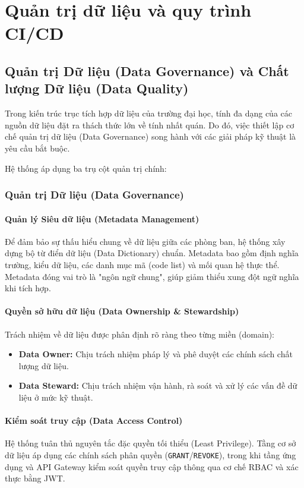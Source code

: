 \chapter{Quản trị dữ liệu và quy trình CI/CD}
\label{ch:data_gov}

\section{Quản trị Dữ liệu (Data Governance) và Chất lượng Dữ liệu (Data Quality)}

Trong kiến trúc trục tích hợp dữ liệu của trường đại học, tính đa dạng của các nguồn dữ liệu đặt ra thách thức lớn về tính nhất quán. Do đó, việc thiết lập cơ chế quản trị dữ liệu (Data Governance) song hành với các giải pháp kỹ thuật là yêu cầu bắt buộc.

Hệ thống áp dụng ba trụ cột quản trị chính:

\subsection{Quản trị Dữ liệu (Data Governance)}

\subsubsection{Quản lý Siêu dữ liệu (Metadata Management)}
Để đảm bảo sự thấu hiểu chung về dữ liệu giữa các phòng ban, hệ thống xây dựng bộ từ điển dữ liệu (Data Dictionary) chuẩn. Metadata bao gồm định nghĩa trường, kiểu dữ liệu, các danh mục mã (code list) và mối quan hệ thực thể. Metadata đóng vai trò là "ngôn ngữ chung", giúp giảm thiểu xung đột ngữ nghĩa khi tích hợp.

\subsubsection{Quyền sở hữu dữ liệu (Data Ownership \& Stewardship)}
Trách nhiệm về dữ liệu được phân định rõ ràng theo từng miền (domain):
\begin{itemize}
    \item \textbf{Data Owner:} Chịu trách nhiệm pháp lý và phê duyệt các chính sách chất lượng dữ liệu.
    \item \textbf{Data Steward:} Chịu trách nhiệm vận hành, rà soát và xử lý các vấn đề dữ liệu ở mức kỹ thuật.
\end{itemize}

\subsubsection{Kiểm soát truy cập (Data Access Control)}
Hệ thống tuân thủ nguyên tắc đặc quyền tối thiểu (Least Privilege). Tầng cơ sở dữ liệu áp dụng các chính sách phân quyền (\texttt{GRANT}/\texttt{REVOKE}), trong khi tầng ứng dụng và API Gateway kiểm soát quyền truy cập thông qua cơ chế RBAC và xác thực bằng JWT.

